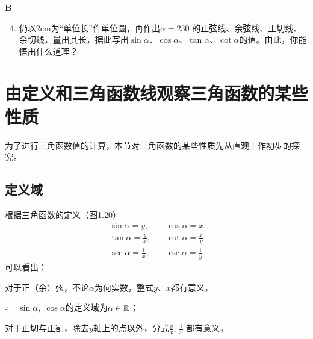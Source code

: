 \begin{center}
    \bfseries B
\end{center}

\begin{enumerate}\setcounter{enumi}{3}
    \item 仍以2cm为“单位长”作单位圆，再作出$\alpha=230^{\circ}$的正弦线、余弦线、正切线、余切线，量出其长，据此写出$\sin\alpha$、$\cos\alpha$、$\tan\alpha$、$\cot\alpha$的值。由此，你能悟出什么道理？
\end{enumerate}

\section{由定义和三角函数线观察三角函数的某些性质}
为了进行三角函数值的计算，本节对三角函数的某些性质先从直观上作初步的探究。

\subsection{定义域}

\noindent
\begin{minipage}{.45\textwidth}
\CTEXindent    根据三角函数的定义（图1.20）
\[\begin{split}
    \sin\alpha=y,&\quad \cos\alpha=x\\ 
    \tan\alpha=\frac{y}{x},&\quad \cot\alpha=\frac{x}{y}\\
    \sec\alpha=\frac{1}{x},&\quad \csc\alpha=\frac{1}{y}
\end{split}\]
可以看出：

对于正（余）弦，不论$\alpha$为何实数，整式$y$、$x$都有意义，

$\therefore\quad \sin\alpha,\; \cos\alpha$的定义域为$\alpha\in\mathbb{R}$；


\end{minipage}\hfill
\begin{minipage}{.45\textwidth}
\centering
{}
\end{minipage}

对于正切与正割，除去$y$轴上的点以外，分式$\frac{y}{x}$, $\frac{1}{x}$
都有意义，

